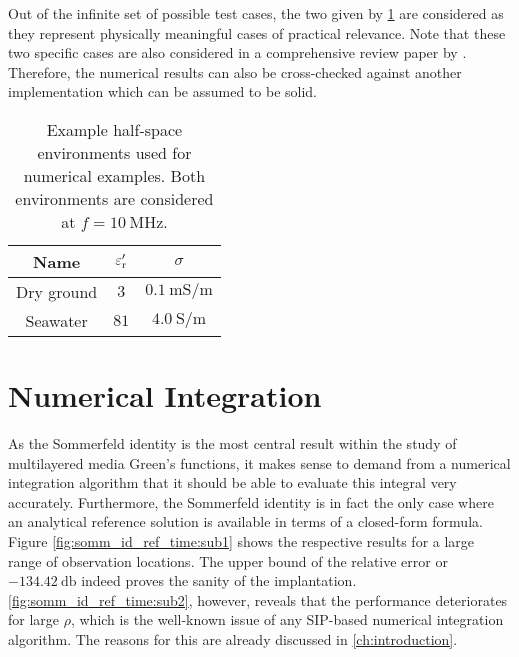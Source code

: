 Out of the infinite set of possible test cases, the two given by
\cref{tab:numerical_examples_half_spaces} are considered as they
represent physically meaningful cases of practical relevance.
Note that these two specific cases are also considered in a comprehensive
review paper by \textcite{Michalski2016b}.
Therefore, the numerical results can also be cross-checked against another
implementation which can be assumed to be solid.
\begin{table}[hbt]
	\centering
	\begin{tabular}{ccc}
		\toprule%
		Name & $\varepsilon_{\mathrm{r}}^\prime$ & $\sigma$ \\
		\midrule
		Dry ground & $\num{3}$  & $\SI{0.1}{\milli\siemens\per\metre}$ \\
		Seawater   & $\num{81}$ & $\SI{4.0}{\siemens\per\metre}$ \\
		\bottomrule
	\end{tabular}
	\caption[Example half-space environments]
	{Example half-space environments used for numerical examples.
    Both environments are considered at $f = \SI{10}{\mega\hertz}$.}
	\label{tab:numerical_examples_half_spaces}
\end{table}


\section{Numerical Integration}

As the Sommerfeld identity is the most central result within the study of
multilayered media Green's functions, it makes sense to demand from a numerical
integration algorithm that it should be able to evaluate this integral very
accurately.
Furthermore, the Sommerfeld identity is in fact the only case where an
analytical reference solution is available in terms of a closed-form formula.
Figure \cref{fig:somm_id_ref_time:sub1} shows the respective results for a large
range of observation locations.
The upper bound of the relative error or $\SI{-134.42}{\decibel}$ indeed
proves the sanity of the implantation.
\cref{fig:somm_id_ref_time:sub2}, however, reveals that the performance
deteriorates for large $\rho$, which is the well-known issue of any
\ac{SIP}-based numerical integration algorithm.
The reasons for this are already discussed in \cref{ch:introduction}.

